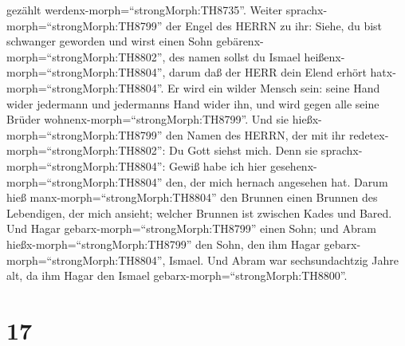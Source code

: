 gezählt werdenx-morph=``strongMorph:TH8735''.  Weiter
sprachx-morph=``strongMorph:TH8799'' der Engel des HERRN zu ihr: Siehe,
du bist schwanger geworden und wirst einen Sohn
gebärenx-morph=``strongMorph:TH8802'', des namen sollst du Ismael
heißenx-morph=``strongMorph:TH8804'', darum daß der HERR dein Elend
erhört hatx-morph=``strongMorph:TH8804''.  Er wird ein
wilder Mensch sein: seine Hand wider jedermann und jedermanns Hand wider
ihn, und wird gegen alle seine Brüder
wohnenx-morph=``strongMorph:TH8799''.  Und sie
hießx-morph=``strongMorph:TH8799'' den Namen des HERRN, der mit ihr
redetex-morph=``strongMorph:TH8802'': Du Gott siehst mich. Denn sie
sprachx-morph=``strongMorph:TH8804'': Gewiß habe ich hier
gesehenx-morph=``strongMorph:TH8804'' den, der mich hernach angesehen
hat.  Darum hieß manx-morph=``strongMorph:TH8804'' den
Brunnen einen Brunnen des Lebendigen, der mich ansieht; welcher Brunnen
ist zwischen Kades und Bared.  Und Hagar
gebarx-morph=``strongMorph:TH8799'' einen Sohn; und Abram
hießx-morph=``strongMorph:TH8799'' den Sohn, den ihm Hagar
gebarx-morph=``strongMorph:TH8804'', Ismael.  Und Abram war
sechsundachtzig Jahre alt, da ihm Hagar den Ismael
gebarx-morph=``strongMorph:TH8800''.

\hypertarget{section-16}{%
\section{17}\label{section-16}}

